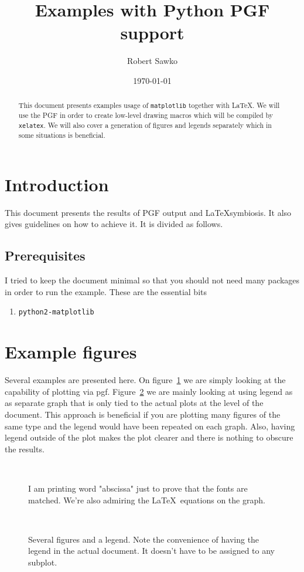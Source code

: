 \documentclass[a4paper,12pt]{article}
\date{\today}
\author{Robert Sawko}
\affil{Department of Engineering Computing, Cranfield University}
\title{Examples with Python PGF support}
\begin{document}
\maketitle

\begin{abstract}

  This document presents examples usage of \texttt{matplotlib} together with
  \LaTeX. We will use the PGF in order to create low-level drawing macros which
  will be compiled by \texttt{xelatex}. We will also cover a generation of
  figures and legends separately which in some situations is beneficial. 
\end{abstract}

\section{Introduction}
This document presents the results of PGF output and \LaTeX symbiosis. It also
gives guidelines on how to achieve it. It is divided as follows.

\subsection{Prerequisites}
I tried to keep the document minimal so that you should not need many packages
in order to run the example. These are the essential bits
\begin{enumerate}
  \item \texttt{python2-matplotlib}
\end{enumerate}

\section{Example figures}

Several examples are presented here. On figure~\ref{fig:latex} we are simply
looking at the capability of plotting via pgf. Figure~\ref{fig:several} we are
mainly looking at using legend as as separate graph that is only tied to the
actual plots at the level of the document. This approach is beneficial if you
are plotting many figures of the same type and the legend would have been
repeated on each graph. Also, having legend outside of the plot makes the plot
clearer and there is nothing to obscure the results.


\begin{figure}[b] 
  \centering
   
  \\
  \caption{I am printing word "abscissa" just to prove that the fonts are
  matched. We're also admiring the \LaTeX\ equations on the graph.}
  \label{fig:latex} 
\end{figure}
\begin{figure}[b] 
  \centering
   
   
   
  \\
   
  \caption{Several figures and a legend. Note the convenience of having the
  legend in the actual document. It doesn't have to be assigned to any subplot.}
  \label{fig:several} 
\end{figure}
\end{document}
